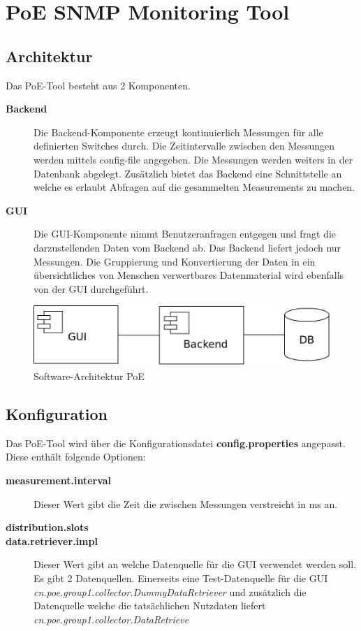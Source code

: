 \section{PoE SNMP Monitoring Tool}
\label{sec:tool}

\subsection{Architektur}

Das PoE-Tool besteht aus 2 Komponenten.

\begin{description}
  \item [\textbf{Backend}] Die Backend-Komponente erzeugt kontinuierlich
  Messungen für alle definierten Switches durch. Die Zeitintervalle zwischen den Messungen
  werden mittels config-file angegeben. Die Messungen werden weiters in der
  Datenbank abgelegt. Zusätzlich bietet das Backend eine Schnittstelle an welche
  es erlaubt Abfragen auf die gesammelten Measurements zu machen.
  \item [\textbf{GUI}] Die GUI-Komponente nimmt Benutzeranfragen entgegen und
  fragt die darzustellenden Daten vom Backend ab. Das Backend liefert jedoch nur
  Messungen. Die Gruppierung und Konvertierung der Daten in ein übersichtliches
  von Menschen verwertbares Datenmaterial wird ebenfalls von der GUI
  durchgeführt.  
\end{description}


\begin{figure}[h]
    \centering
    \leavevmode
    \includegraphics[width=1.0\linewidth]{figures/architecture.jpeg}
    \caption{Software-Architektur PoE}
    \label{fig:Software-Architektue PoE}
\end{figure}

\subsection{Konfiguration}

Das PoE-Tool wird über die Konfigurationsdatei
\textbf{config.properties} angepasst. Diese enthält folgende Optionen:

\begin{description}
  \item [\textbf{measurement.interval}] Dieser Wert gibt die Zeit die zwischen
  Messungen verstreicht in ms an.
  \item [\textbf{distribution.slots}]
  \item [\textbf{data.retriever.impl}] Dieser Wert gibt an welche Datenquelle
  für die GUI verwendet werden soll. Es gibt 2 Datenquellen. Einerseits eine
  Test-Datenquelle für die GUI
  \textit{cn.poe.group1.collector.DummyDataRetriever} und zusätzlich die
  Datenquelle welche die tatsächlichen Nutzdaten liefert \textit{cn.poe.group1.collector.DataRetrieve}
\end{description}

